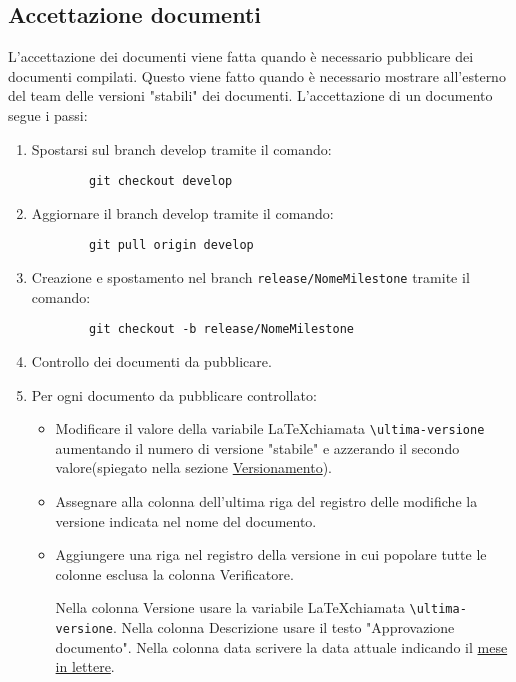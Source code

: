 \documentclass[a4paper, 12pt]{article}
\def\ultima-versione{ v0.1 }
\begin{document}
\subsection{Accettazione documenti}
\label{subsec:acc}
L'accettazione dei documenti viene fatta quando è necessario pubblicare dei documenti compilati.
Questo viene fatto quando è necessario mostrare all'esterno del team delle versioni "stabili" dei documenti.
L'accettazione di un documento segue i passi:
\begin{enumerate}
    \item Spostarsi sul branch develop tramite il comando:
    \begin{lstlisting}
        git checkout develop
    \end{lstlisting}
     
    \item Aggiornare il branch develop tramite il comando: 
    \begin{lstlisting}
        git pull origin develop
    \end{lstlisting}
    
    \item Creazione e spostamento nel branch \lstinline|release/NomeMilestone| tramite il comando:
    \begin{lstlisting}
        git checkout -b release/NomeMilestone
    \end{lstlisting}

    \item Controllo dei documenti da pubblicare.
    
    \item Per ogni documento da pubblicare controllato:
    \begin{itemize}
        \item Modificare il valore della variabile \LaTeX \space chiamata \lstinline|\ultima-versione| aumentando il numero di versione "stabile" e azzerando il secondo valore(spiegato nella sezione \hyperref[subsec:vers]{Versionamento}).

        \item Assegnare alla colonna dell'ultima riga del registro delle modifiche la versione indicata nel nome del documento.
        
        \item Aggiungere una riga nel registro della versione in cui popolare tutte le colonne esclusa la colonna Verificatore.  
        
        Nella colonna Versione usare la variabile \LaTeX \space chiamata \lstinline|\ultima-versione|.
        Nella colonna Descrizione usare il testo "Approvazione documento".
        Nella colonna data scrivere la data attuale indicando il \underline{mese in lettere}.
    \end{itemize}
   

\end{enumerate}
\end{document}

